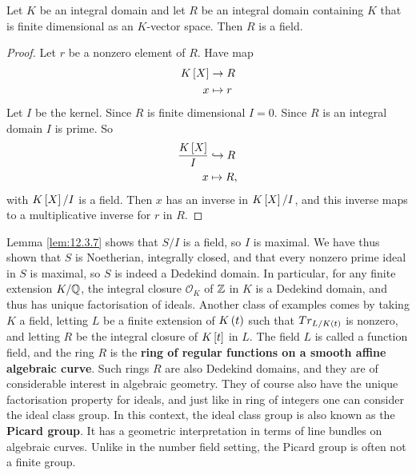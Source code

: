 \begin{lemma}
\label{lem:12.3.7}
Let $ K $ be an integral domain and let $ R $ be an integral domain containing $ K $ that is finite dimensional as an $ K $-vector space. Then $ R $ is a field.
\end{lemma}

\begin{proof}
Let $ r $ be a nonzero element of $ R $. Have map
\begin{align*}
K\sb{X} & \to R \\
x & \mapsto r
\end{align*}
Let $ I $ be the kernel. Since $ R $ is finite dimensional $ I = 0 $. Since $ R $ is an integral domain $ I $ is prime. So
\begin{align*}
\dfrac{K\sb{X}}{I} & \hookrightarrow R \\
x & \mapsto R,
\end{align*}
with $ K\sb{X} / I $ is a field. Then $ x $ has an inverse in $ K\sb{X} / I $, and this inverse maps to a multiplicative inverse for $ r $ in $ R $.
\end{proof}

Lemma \ref{lem:12.3.7} shows that $ S / I $ is a field, so $ I $ is maximal. We have thus shown that $ S $ is Noetherian, integrally closed, and that every nonzero prime ideal in $ S $ is maximal, so $ S $ is indeed a Dedekind domain. In particular, for any finite extension $ K / \Q $, the integral closure $ \mathcal{O}_K $ of $ \Z $ in $ K $ is a Dedekind domain, and thus has unique factorisation of ideals. Another class of examples comes by taking $ K $ a field, letting $ L $ be a finite extension of $ K\rb{t} $ such that $ Tr_{L / K\rb{t}} $ is nonzero, and letting $ R $ be the integral closure of $ K\sb{t} $ in $ L $. The field $ L $ is called a function field, and the ring $ R $ is the \textbf{ring of regular functions on a smooth affine algebraic curve}. Such rings $ R $ are also Dedekind domains, and they are of considerable interest in algebraic geometry. They of course also have the unique factorisation property for ideals, and just like in ring of integers one can consider the ideal class group. In this context, the ideal class group is also known as the \textbf{Picard group}. It has a geometric interpretation in terms of line bundles on algebraic curves. Unlike in the number field setting, the Picard group is often not a finite group.

\pagebreak


